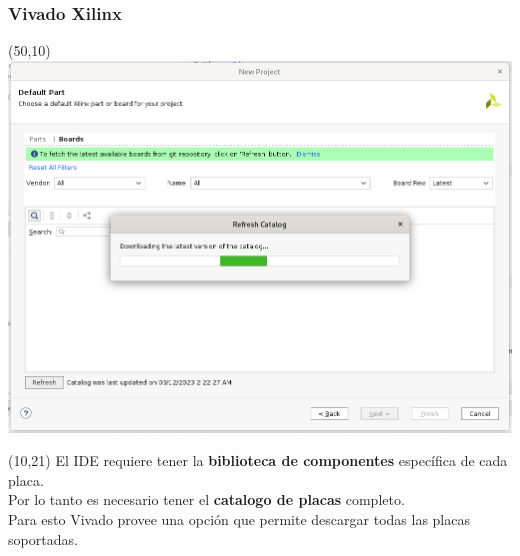 \documentclass[aspectratio=169]{beamer}
\begin{document}
\begin{frame}[fragile,t]
    \frametitle{Vivado Xilinx}
    \begin{textblock}{75}(50,10) \includegraphics[scale=0.27]{img/vivado/08_update_catalog.png} \end{textblock}
    \begin{textblock}{38}(10,21) \small
     El IDE requiere tener la \textbf{biblioteca de componentes} específica de cada placa.\\
     \bigskip
     Por lo tanto es necesario tener el \textbf{catalogo de placas} completo.\\
     \bigskip
     Para esto Vivado provee una opción que permite descargar todas las placas soportadas.
    \end{textblock}
\end{frame}
    
\end{document}
